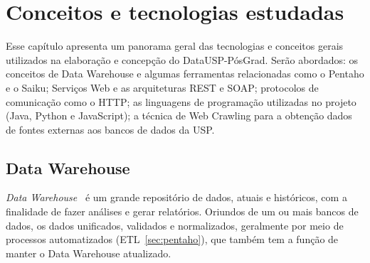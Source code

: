 \chapter{Conceitos e tecnologias estudadas}
\label{ch:2}

Esse capítulo apresenta um panorama geral das tecnologias e conceitos gerais utilizados na elaboração e concepção do DataUSP-PósGrad. Serão abordados: os conceitos de Data Warehouse e algumas ferramentas relacionadas como o Pentaho e o Saiku; Serviços Web e as arquiteturas REST e SOAP; protocolos de comunicação como o HTTP; as linguagens de programação utilizadas no projeto (Java, Python e JavaScript); a técnica de Web Crawling para a obtenção dados de fontes externas aos bancos de dados da USP.
  
\section{Data Warehouse}
\label{sec:dw}
   \emph{Data Warehouse}~\cite{OIJ} é um grande repositório de dados, atuais e históricos, com a finalidade de fazer análises e gerar relatórios.
Oriundos de um ou mais bancos de dados, os dados unificados, validados e normalizados, geralmente por meio de processos automatizados (ETL~\ref{sec:pentaho}), que também tem a função de manter o Data Warehouse atualizado.


